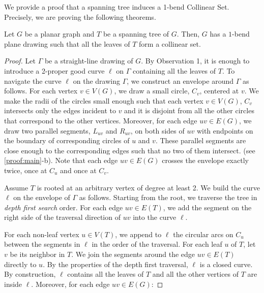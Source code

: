 

We provide a proof that a spanning tree induces a 1-bend Collinear Set. Precisely, we are proving the following theorems.

\begin{thm} \label{app-main}

Let $G$ be a planar graph and $T$ be a spanning tree of $G$. Then, $G$ has a $1$-bend plane drawing such that all the leaves of $T$ form a collinear set.

\end{thm}

\begin{proof}

    Let $\Gamma$ be a straight-line drawing of $G$.
    By Observation 1, it is enough to introduce a 2-proper good curve $\ell$ on $\Gamma$ containing all the leaves of $T$. To navigate the curve $\ell$ on the drawing $\Gamma$, we construct an envelope around $\Gamma$ as follows. For each vertex $v \in V(G)$, we draw a small circle, $C_v$, centered at $v$. We make the radii of the circles small enough such that each vertex $v \in V(G)$, $C_v$ intersects only the edges incident to $v$ and it is disjoint from all the other circles that correspond to the other vertices. Moreover, for each edge $uv \in E(G)$, we draw two parallel segments, $L_{uv}$ and $R_{uv}$, on both sides of $uv$ with endpoints on the boundary of corresponding circles of $u$ and $v$. These parallel segments are close enough to the corresponding edges such that no two of them intersect. (see \cref{proof:main}-b). Note that each edge $uv \in E(G)$ crosses the envelope exactly twice, once at $C_u$ and once at $C_v$.

    Assume $T$ is rooted at an arbitrary vertex of degree at least 2. We build the curve $\ell$ on the envelope of $\Gamma$ as follows. Starting from the root, we traverse the tree in \textit{depth first search} order. For each edge $uv \in E(T)$, we add the segment on the right side of the traversal direction of $uv$ into the curve $\ell$.

    For each non-leaf vertex $u \in V(T)$, we append to $\ell$ the circular arcs on $C_u$ between the segments in $\ell$ in the order of the traversal. For each leaf $u$ of $T$, let $v$ be its neighbor in $T$. We join the segments around the edge $uv \in E(T)$ directly to $u$. By the properties of the depth first traversal, $\ell$ is a closed curve. By construction, $\ell$ contains all the leaves of $T$ and all the other vertices of $T$ are inside $\ell$. Moreover, for each edge $uv \in E(G)$:


\end{proof}
